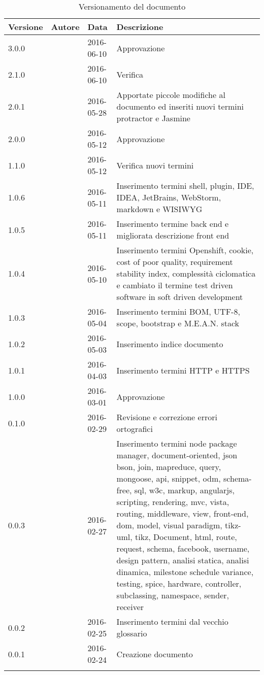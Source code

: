 \documentclass[12pt,a4paper]{article}
\begin{document}
\begin{center}
	\begin{longtable}[H]{p{} p{} p{} p{}}
		\toprule
		\textbf{Versione}	&	\textbf{Autore}	&	\textbf{Data}	&	\textbf{Descrizione}\\*
		\midrule
		\midrule
		3.0.0 & \AVI & 2016-06-10 & Approvazione \\*
		\midrule
		2.1.0 & \NDC & 2016-06-10 & Verifica \\*
		\midrule
		2.0.1 & \WS & 2016-05-28 & Apportate piccole modifiche al documento ed inseriti nuovi termini protractor e Jasmine \\*
		\midrule
		2.0.0 & \WS & 2016-05-12 & Approvazione \\*
		\midrule
		1.1.0 & \NDC & 2016-05-12 & Verifica nuovi termini \\*
		\midrule
		1.0.6 & \WS & 2016-05-11  & Inserimento termini shell, plugin, IDE, IDEA, JetBrains, WebStorm, markdown e WISIWYG\\*
		\midrule
		1.0.5 & \TP{} & 2016-05-11 & Inserimento termine back end e migliorata descrizione front end \\*
		\midrule
		1.0.4 & \WS & 2016-05-10 & Inserimento termini Openshift, cookie, cost of poor quality, requirement stability index, complessità ciclomatica e cambiato il termine test driven software in soft driven development\\*
		\midrule
		1.0.3 & \WS & 2016-05-04  & Inserimento termini BOM, UTF-8, scope, bootstrap e M.E.A.N. stack \\*
		\midrule
		1.0.2 & \WS & 2016-05-03  & Inserimento indice documento \\*
		\midrule
		1.0.1 & \TP & 2016-04-03  & Inserimento termini HTTP e HTTPS \\*
		\midrule
		1.0.0 & \TP & 2016-03-01  & Approvazione \\*
		\midrule
		0.1.0 & \NDC & 2016-02-29 & Revisione e correzione errori ortografici \\*
		\midrule
		0.0.3 & \AB & 2016-02-27  & Inserimento termini node package manager, document-oriented, json
		bson, join, mapreduce, query, mongoose, api, snippet, odm, schema-free, sql, w3c, markup, angularjs, scripting, rendering, mvc,  vista, routing, middleware, view, front-end, dom, model, visual paradigm, tikz-uml, tikz, Document, html, route, request, schema, facebook, username, design pattern, analisi statica, analisi dinamica, milestone schedule variance,  testing, spice, hardware, controller, subclassing, namespace, sender, receiver \\*
		\midrule
		0.0.2 & \WS & 2016-02-25  & Inserimento termini dal vecchio glossario \\*
		\midrule
		0.0.1 & \WS & 2016-02-24  & Creazione documento \\*
		\bottomrule
		\caption{Versionamento del documento}
		\label{tabVers1}
	\end{longtable}
\end{center}
\end{document}
